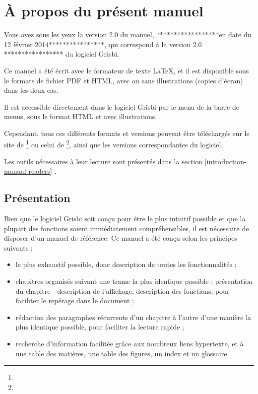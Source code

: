 \section{À propos du présent manuel\label{introduction-manual}}


Vous avez sous les yeux la version \actuality{}2.0 du manuel, ******************en date du \actuality{} 12 février 2014****************, qui correspond à la version 2.0 ***************** du logiciel Grisbi. 

Ce manuel a été écrit avec le \gls{formateur de texte} \gls{LaTeX}, et il est disponible sous le \gls{formats de fichier} PDF et HTML, avec ou sans illustrations (copies d'écran) dans les deux cas. 

Il est accessible directement dans le logiciel Grisbi par le menu  de la barre de menus, sous le format HTML et avec illustrations.

Cependant, tous ces différents formats et versions peuvent être téléchargés sur le site de \footnote{\urlGrisbi{}} ou celui de \footnote{\urlSourceForgeDocumentation{}}, ainsi que les versions correspondantes du logiciel.

Les outils nécessaires à leur lecture sont présentés dans la section \vref{introduction-manual-readers} .


\subsection{Présentation\label{introduction-manual-presentation}}

Bien que le logiciel Grisbi soit conçu pour être le plus intuitif possible et que la plupart des fonctions soient immédiatement compréhensibles, il est nécessaire de disposer d'un manuel de référence. Ce manuel a été conçu selon les principes suivants :

\begin{itemize} 
	\item le plus exhaustif possible, donc description de toutes les fonctionnalités ;
	\item chapitres organisés suivant une trame la plus identique possible : présentation du chapitre - description de l'affichage, description des fonctions, pour faciliter le repérage dans le document ;
	\item rédaction des paragraphes récurrents d'un chapitre à l'autre d'une manière la plus identique possible, pour faciliter la lecture rapide ;
	\item recherche d'information facilitée grâce aux nombreux \gls{liens hypertexte}, et à une table des matières, une table des figures, un index et un glossaire.
\end{itemize}

